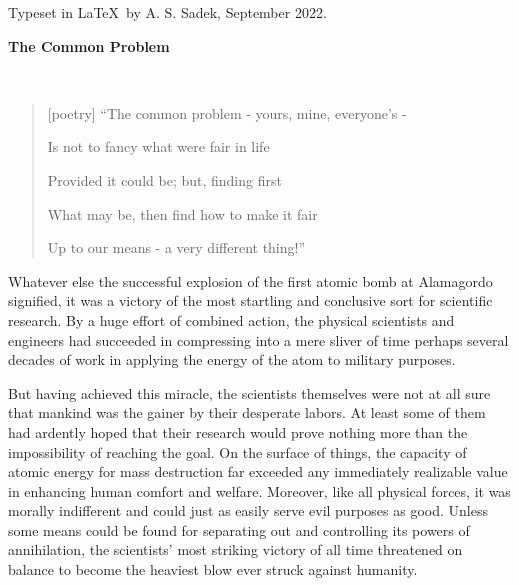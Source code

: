 \acknowledgments
Typeset in \LaTeX~by A. S. Sadek, September 2022.



\begin{introduction}

\vspace{-25pt}

{\huge \textbf{The Common Problem}}

\vspace{40pt}

\\

\vspace{-17pt}
\begin{quote}[poetry]
\raggedleft
``The common problem - yours, mine, everyone's -

Is not to fancy what were fair in life

Provided it could be; but, finding first

What may be, then find how to make it fair

Up to our means - a very different thing!''
\end{quote}

\vspace{10pt}

Whatever else the successful explosion of the first atomic bomb at Alamagordo signified, it was a victory of the most startling and conclusive sort for scientific research. By a huge effort of combined action, the physical scientists and engineers had succeeded in compressing into a mere sliver of time perhaps several decades of work in applying the energy of the atom to military purposes.

But having achieved this miracle, the scientists themselves were not at all sure that mankind was the gainer by their desperate labors. At least some of them had ardently hoped that their research would prove nothing more than the impossibility of reaching the goal. On the surface of things, the capacity of atomic energy for mass destruction far exceeded any immediately realizable value in enhancing human comfort and welfare. Moreover, like all physical forces, it was morally indifferent and could just as easily serve evil purposes as good. Unless some means could be found for separating out and controlling its powers of annihilation, the scientists' most striking victory of all time threatened on balance to become the heaviest blow ever struck against humanity.


\end{introduction}
